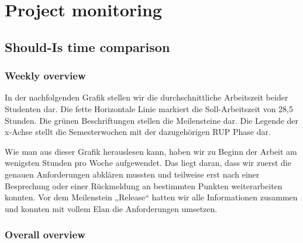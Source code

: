 \chapter{Project monitoring}
\section{Should-Is time comparison}
\subsection{Weekly overview}
In der nachfolgenden Grafik stellen wir die durchschnittliche Arbeitszeit beider Studenten dar. 
Die fette Horizontale Linie markiert die Soll-Arbeitszeit von 28,5 Stunden. 
Die grünen Beschriftungen stellen die Meilensteine dar. 
Die Legende der x-Achse stellt die Semesterwochen mit der dazugehörigen RUP Phase dar.

Wie man aus dieser Grafik herauslesen kann, haben wir zu Beginn der Arbeit 
am wenigsten Stunden pro Woche aufgewendet. Das liegt daran, dass wir zuerst die 
genauen Anforderungen abklären mussten und teilweise erst nach einer Besprechung 
oder einer Rückmeldung an bestimmten Punkten weiterarbeiten konnten. 
Vor dem Meilenstein „Release“ hatten wir alle Informationen zusammen und 
konnten mit vollem Elan die Anforderungen umsetzen.

\subsection{Overall overview}

